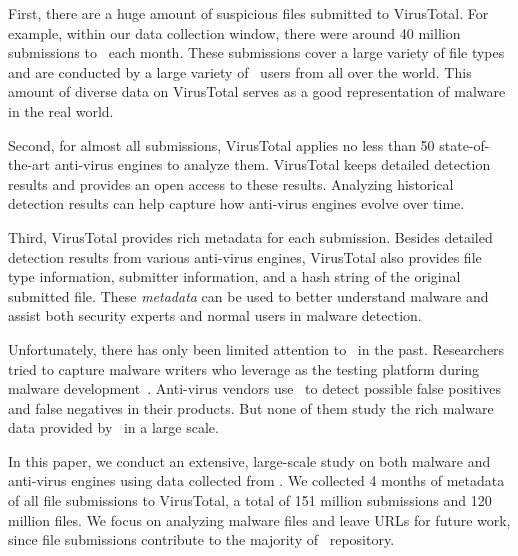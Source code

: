 First, there are a huge amount of suspicious files submitted to VirusTotal. 
For example, within our data collection window, 
there were around 40 million submissions to \vt\ each month. 
These submissions cover a large variety of file types and 
are conducted by a large variety of \vt\ users from all over the world. 
This amount of diverse data on VirusTotal serves as a good representation of malware in the real world.  

Second, for almost all submissions, 
VirusTotal applies no less than 50 state-of-the-art anti-virus engines to analyze them. 
VirusTotal keeps detailed detection results and provides an open access to these results. 
Analyzing historical detection results can help capture how anti-virus engines evolve over time. 

Third, VirusTotal provides rich metadata for each submission. 
Besides detailed detection results from various anti-virus engines, 
VirusTotal also provides file type information, submitter information, and a hash string of the original submitted file.
These {\em metadata} can be used to better understand malware 
and assist both security experts and normal users in malware detection.

Unfortunately, there has only been limited attention to \vt\ in the past. 
Researchers tried to capture malware writers who leverage \vt{} as the testing platform during malware development~\cite{huangvt2016bigdata, neeles}. 
Anti-virus vendors use \vt\ to detect possible false positives and false negatives in their products. 
But none of them study the rich malware data provided by \vt\ in a large scale. 

In this paper, we conduct an extensive, large-scale study on both malware and anti-virus engines
using data collected from \vt.
We collected 4 months of metadata of all file submissions to VirusTotal, 
a total of 151 million submissions and 120 million files.
We focus on analyzing malware files and leave URLs for future work, 
since file submissions contribute to the majority of \vt\ repository.

